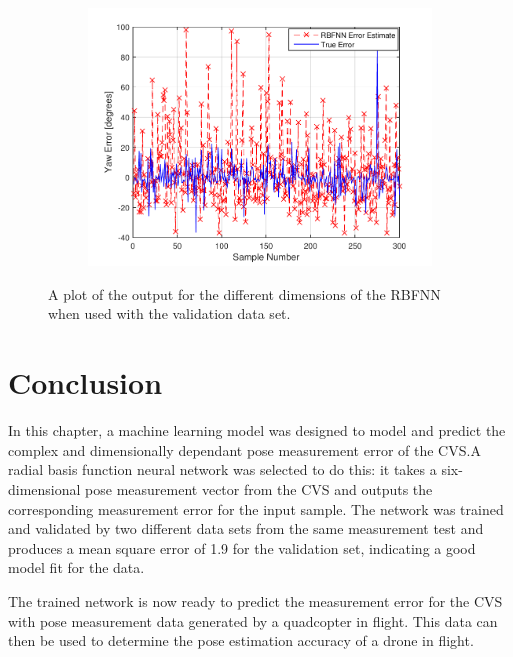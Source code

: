 \begin{figure}
\begin{subfigure}{0.3\textwidth}
    \includegraphics[width=\textwidth]{figures/chapter4/yaw_valid}
    \caption{}
  \end{subfigure}
  \caption[The output of the RBFNN with the validation set input.]{A plot of the output for the different dimensions of the RBFNN when used with the validation data set.}
  \label{fig:chap4-rbf-valid}
\end{figure}

\section{Conclusion}

In this chapter, a machine learning model was designed to model and predict the complex and dimensionally dependant pose measurement error of the CVS.\@ A radial basis function neural network was selected to do this: it takes a six-dimensional pose measurement vector from the CVS and outputs the corresponding measurement error for the input sample. The network was trained and validated by two different data sets from the same measurement test and produces a mean square error of 1.9 for the validation set, indicating a good model fit for the data. 

The trained network is now ready to predict the measurement error for the CVS with pose measurement data generated by a quadcopter in flight. This data can then be used to determine the pose estimation accuracy of a drone in flight. 
